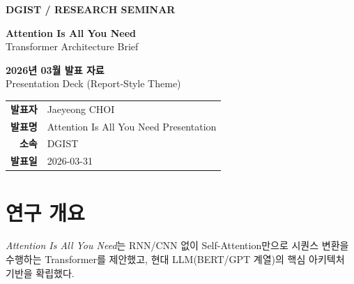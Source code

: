 \documentclass[11pt]{article}
\newenvironment{keybox}[2]{%
  \begin{tcolorbox}[colback=#1, colframe=dgistblue!60,
    title={\small\bfseries\color{white}#2},
    fonttitle=\small\bfseries,
    coltitle=white, colbacktitle=dgistblue,
    left=6pt, right=6pt, top=4pt, bottom=4pt,
    boxrule=0.6pt]
}{\end{tcolorbox}}
\begin{document}
\begin{titlepage}
\pagecolor{dgistnavy}
\color{white}
\vspace*{1.0cm}

\begin{center}
{\small\color{dgistlight}\textbf{DGIST / RESEARCH SEMINAR}}\\[0.9cm]

\begin{tcolorbox}[colback=white!8!dgistnavy, colframe=white!30!dgistnavy,
  boxrule=1pt, left=20pt, right=20pt, top=14pt, bottom=14pt]
\centering
{\Large\bfseries\color{white}
Attention Is All You Need}\\[0.45cm]
{\normalsize\color{dgistlight}
Transformer Architecture Brief}
\end{tcolorbox}

\vspace{0.7cm}
{\Large\bfseries\color{dgistlight} 2026년 03월 발표 자료}\\[0.2cm]
{\small\color{gray!60!white} Presentation Deck (Report-Style Theme)}

\vspace{0.9cm}

\begin{tabular}{rl}
\color{dgistlight}\textbf{발표자} & \color{white}Jaeyeong CHOI \\
\color{dgistlight}\textbf{발표명} & \color{white}Attention Is All You Need Presentation \\
\color{dgistlight}\textbf{소속} & \color{white}DGIST \\
\color{dgistlight}\textbf{발표일} & \color{white}2026-03-31 \\
\end{tabular}

\vfill
\end{center}
\end{titlepage}

\pagecolor{white}
\color{black}

\section{연구 개요}
\begin{keybox}{bglight}{핵심 요약}
\textit{Attention Is All You Need}는 RNN/CNN 없이 Self-Attention만으로 시퀀스 변환을 수행하는 Transformer를 제안했고,
현대 LLM(BERT/GPT 계열)의 핵심 아키텍처 기반을 확립했다.
\end{keybox}
\end{document}
